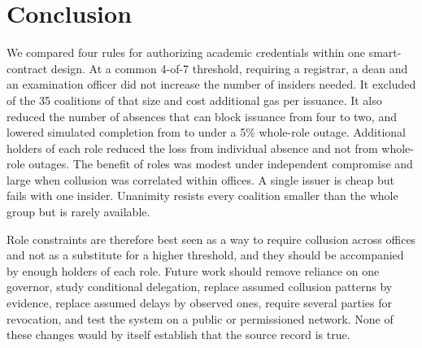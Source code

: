 \section{Conclusion}\label{sec:conclusion}
We compared four rules for authorizing academic credentials within one smart-contract design. At a common 4-of-7 threshold, requiring a registrar, a dean and an examination officer did not increase the number of insiders needed. It excluded \BlockCoalExcluded{} of the 35 coalitions of that size and cost \GasRoleOverhead{} additional gas per issuance. It also reduced the number of absences that can block issuance from four to two, and lowered simulated completion from \OutageFiveC{} to \OutageFiveD{} under a 5\% whole-role outage. Additional holders of each role reduced the loss from individual absence and not from whole-role outages. The benefit of roles was modest under independent compromise and large when collusion was correlated within offices. A single issuer is cheap but fails with one insider. Unanimity resists every coalition smaller than the whole group but is rarely available.

Role constraints are therefore best seen as a way to require collusion across offices and not as a substitute for a higher threshold, and they should be accompanied by enough holders of each role. Future work should remove reliance on one governor, study conditional delegation, replace assumed collusion patterns by evidence, replace assumed delays by observed ones, require several parties for revocation, and test the system on a public or permissioned network. None of these changes would by itself establish that the source record is true.
